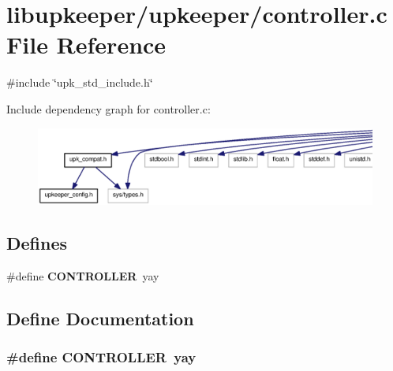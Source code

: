 \section{libupkeeper/upkeeper/controller.c File Reference}
\label{libupkeeper_2upkeeper_2controller_8c}
{\ttfamily \#include \char`\"{}upk\_\-std\_\-include.h\char`\"{}}\par
Include dependency graph for controller.c:\nopagebreak
\begin{figure}[H]
\begin{center}
\leavevmode
\includegraphics[width=400pt]{libupkeeper_2upkeeper_2controller_8c__incl}
\end{center}
\end{figure}
\subsection*{Defines}
\begin{DoxyCompactItemize}
\item 
\#define {\bf CONTROLLER}~yay
\end{DoxyCompactItemize}


\subsection{Define Documentation}
\subsubsection[{CONTROLLER}]{\setlength{\rightskip}{0pt plus 5cm}\#define CONTROLLER~yay}\label{libupkeeper_2upkeeper_2controller_8c_a6fa0e88c2f73f4e656831351dfdbf6e5}
